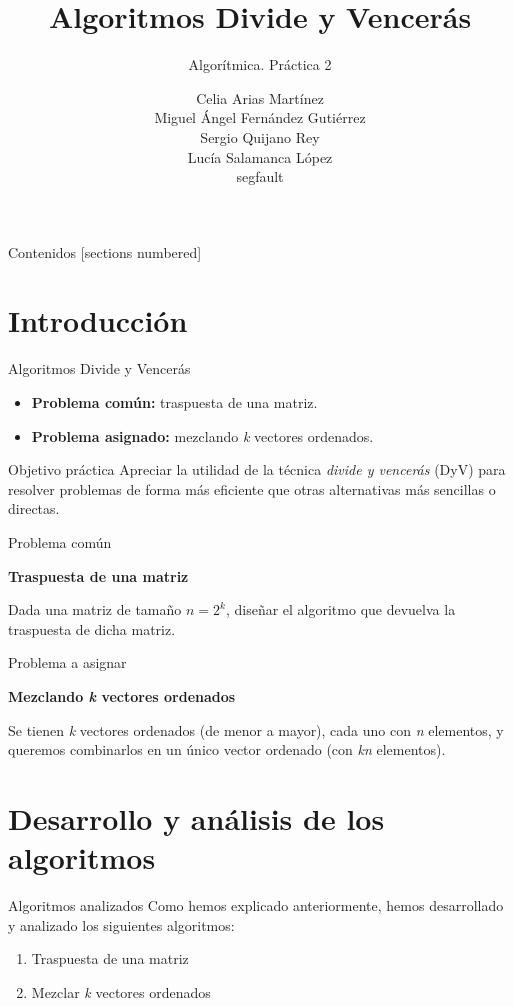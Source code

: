 \documentclass[10pt, xcolor=table]{beamer}
\title{Algoritmos Divide y Vencerás}
\subtitle{Algorítmica. \alert{Práctica 2}}
\date{}
\author{Celia Arias Martínez\\Miguel Ángel Fernández Gutiérrez\\Sergio Quijano Rey\\Lucía Salamanca López\\[4pt]\footnotesize{segfault}}
\begin{document}
\maketitle

\begin{frame}{Contenidos}
	[sections numbered]
	\tableofcontents[]
\end{frame}


\section{Introducción}
\begin{frame}{Algoritmos Divide y Vencerás}
\begin{itemize}
	\item \textbf{Problema común:} traspuesta de una matriz.
	\item \textbf{Problema asignado:} mezclando \textit{k} vectores ordenados.
\end{itemize}
\end{frame}

\begin{frame}{Objetivo práctica}
Apreciar la utilidad de la técnica \emph{divide y vencerás} (DyV)  para resolver problemas de forma más eficiente que otras alternativas más sencillas o directas. 
\end{frame}

\begin{frame}{Problema común}
\begin{center}
\textbf{\large{Traspuesta de una matriz}}
\end{center}
Dada una matriz de tamaño $n=2^k$, diseñar el algoritmo que devuelva la traspuesta de dicha matriz.
\end{frame}

\begin{frame}{Problema a asignar}
\begin{center}
\textbf{\large{Mezclando \textit{k} vectores ordenados}}
\end{center}
Se tienen \textit{k} vectores ordenados (de menor a mayor), cada uno con \textit{n} elementos, y queremos combinarlos en un único vector ordenado (con \textit{kn} elementos). 
\end{frame}

\section{Desarrollo y análisis de los algoritmos}
\begin{frame}{Algoritmos analizados}
Como hemos explicado anteriormente, hemos desarrollado y analizado los siguientes algoritmos:
\begin{enumerate}
	\item Traspuesta de una matriz
	\item Mezclar \textit{k} vectores ordenados	
\end{enumerate}
\end{frame}
\end{document}
